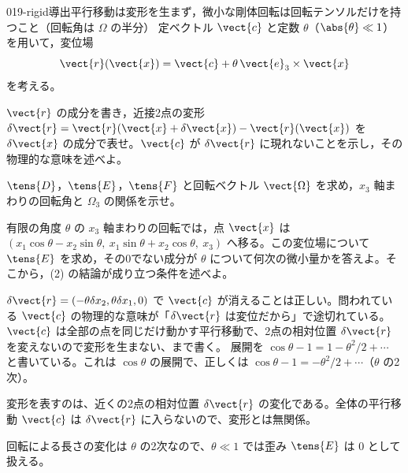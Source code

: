 \documentclass[uplatex,dvipdfmx,a4paper,11pt]{jsarticle}
\begin{document}
\mondaihen
{}
\begin{mondai}{019-rigid}{導出}{平行移動は変形を生まず，微小な剛体回転は回転テンソルだけを持つこと（回転角は $\Omega$ の半分）}
定ベクトル $\vect{c}$ と定数 $\theta$（$\abs{\theta}\ll1$）を用いて，変位場
  \[ \vect{r}(\vect{x})=\vect{c}+\theta\,\vect{e}_3\times\vect{x} \]
  を考える。
  \begin{shoumon}
    \item $\vect{r}$ の成分を書き，近接2点の変形 $\delta\vect{r}=\vect{r}(\vect{x}+\delta\vect{x})-\vect{r}(\vect{x})$ を $\delta\vect{x}$ の成分で表せ。$\vect{c}$ が $\delta\vect{r}$ に現れないことを示し，その物理的な意味を述べよ。
    \item $\tens{D}$，$\tens{E}$，$\tens{F}$ と回転ベクトル $\vect{\Omega}$ を求め，$x_3$ 軸まわりの回転角と $\Omega_3$ の関係を示せ。
    \item 有限の角度 $\theta$ の $x_3$ 軸まわりの回転では，点 $\vect{x}$ は $(x_1\cos\theta-x_2\sin\theta,\ x_1\sin\theta+x_2\cos\theta,\ x_3)$ へ移る。この変位場について $\tens{E}$ を求め，その0でない成分が $\theta$ について何次の微小量かを答えよ。そこから，(2) の結論が成り立つ条件を述べよ。
  \end{shoumon}

\begin{kotaeran}
   $\delta\vect{r}=(-\theta\delta x_{2},\theta\delta x_{1},0)$ で $\vect{c}$ が消えることは正しい。問われている $\vect{c}$ の物理的な意味が「$\delta\vect{r}$ は変位だから」で途切れている。$\vect{c}$ は全部の点を同じだけ動かす平行移動で、2点の相対位置 $\delta\vect{r}$ を変えないので変形を生まない、まで書く。
   展開を $\cos\theta-1=1-\theta^{2}/2+\dotsb$ と書いている。これは $\cos\theta$ の展開で、正しくは $\cos\theta-1=-\theta^{2}/2+\dotsb$（$\theta$ の2次）。
\end{kotaeran}
\begin{rikai}
  \item 変形を表すのは、近くの2点の相対位置 $\delta\vect{r}$ の変化である。全体の平行移動 $\vect{c}$ は $\delta\vect{r}$ に入らないので、変形とは無関係。
  \item 回転による長さの変化は $\theta$ の2次なので、$\theta\ll1$ では歪み $\tens{E}$ は 0 として扱える。
\end{rikai}
\end{mondai}
\end{document}
